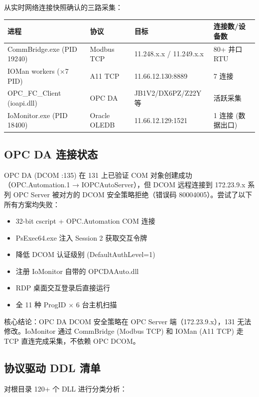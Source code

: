 \documentclass[12pt,a4paper]{ctexart}
\begin{document}
从实时网络连接快照确认的三路采集：

\begin{longtable}{p{2.5cm}p{2.5cm}p{3cm}p{3.5cm}}
\toprule
\textbf{进程} & \textbf{协议} & \textbf{目标} & \textbf{连接数/设备数} \\
\midrule
CommBridge.exe (PID 19240) & Modbus TCP & 11.248.x.x / 11.249.x.x & 80+ 井口 RTU \\
IOMan workers (×7 PID) & A11 TCP & 11.66.12.130:8889 & 7 连接 \\
OPC\_FC\_Client (ioapi.dll) & OPC DA & JB1V2/DX6PZ/Z22Y 等 & 活跃采集 \\
IoMonitor.exe (PID 18400) & Oracle OLEDB & 11.66.12.129:1521 & 1 连接 (数据出口) \\
\bottomrule
\end{longtable}

\subsection{OPC DA 连接状态}

OPC DA (DCOM :135) 在 131 上已验证 COM 对象创建成功（OPC.Automation.1 → IOPCAutoServer），但 DCOM 远程连接到 172.23.9.x 系列 OPC Server 被对方的 DCOM 安全策略拒绝（错误码 80004005）。尝试了以下所有方案均失败：

\begin{itemize}[leftmargin=*]
  \item 32-bit cscript + OPC.Automation COM 连接
  \item PsExec64.exe 注入 Session 2 获取交互令牌
  \item 降低 DCOM 认证级别 (DefaultAuthLevel=1)
  \item 注册 IoMonitor 自带的 OPCDAAuto.dll
  \item RDP 桌面交互登录后直接运行
  \item 全 11 种 ProgID $\times$ 6 台主机扫描
\end{itemize}

核心结论：OPC DA DCOM 安全策略在 OPC Server 端（172.23.9.x），131 无法修改。IoMonitor 通过 CommBridge (Modbus TCP) 和 IOMan (A11 TCP) 走 TCP 直连完成采集，不依赖 OPC DCOM。

\subsection{协议驱动 DDL 清单}

对根目录 120+ 个 DLL 进行分类分析：
\end{document}
